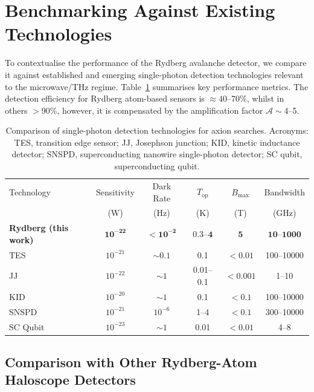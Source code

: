 \section{Benchmarking Against Existing Technologies}
\label{sec:axion_benchmarking}

To contextualise the performance of the Rydberg avalanche detector, we compare it against established and emerging single-photon detection technologies relevant to the microwave/THz regime. Table~\ref{tab:technology_comparison} summarises key performance metrics. The detection efficiency for Rydberg atom-based sensors is $\approx 40$--70\%, whilst in others $>$90\%, however, it is compensated by the amplification factor $\mathcal{A} \sim 4$--5.

\begin{table}[htbp]
\centering
\caption{Comparison of single-photon detection technologies for axion searches. Acronyms: TES, transition edge sensor; JJ, Josephson junction; KID, kinetic inductance detector; SNSPD, superconducting nanowire single-photon detector; SC qubit, superconducting qubit.}
\label{tab:technology_comparison}
\begin{tabular}{lccccc}
\hline\hline
Technology & Sensitivity & Dark Rate & $T_{\mathrm{op}}$ & $B_{\mathrm{max}}$ & Bandwidth \\
 & (W) & (Hz) & (K) & (T) & (GHz) \\
\hline
\textbf{Rydberg (this work)} & $\mathbf{10^{-22}}$ & $\mathbf{< 10^{-2}}$ & $\mathbf{0.3}$--$\mathbf{4}$ & $\mathbf{5}$ & $\mathbf{10}$--$\mathbf{1000}$ \\
TES\cite{Guo2017} & $10^{-21}$ & $\sim 0.1$ & 0.1 & $< 0.01$ & 100--10000 \\
JJ\cite{Pankratov2022} & $10^{-22}$ & $\sim 1$ & 0.01--0.1 & $< 0.001$ & 1--10 \\
KID\cite{Guo2017} & $10^{-20}$ & $\sim 1$ & 0.1 & $< 0.1$ & 100--10000 \\
SNSPD\cite{Chiles2019} & $10^{-21}$ & $10^{-6}$ & 1--4 & $< 0.1$ & 300--10000 \\
SC Qubit\cite{Backes2021,Dixit2025} & $10^{-23}$ & $\sim 1$ & 0.01 & $< 0.01$ & 4--8 \\
\hline\hline
\end{tabular}
\end{table}

\subsection*{Comparison with Other Rydberg-Atom Haloscope Detectors}
\label{sec:rydberg_vs_rydberg}

